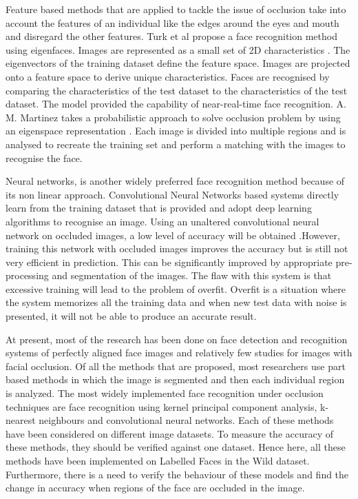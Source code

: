 \documentclass[conference]{IEEEtran}
\begin{document}
Feature based methods that are applied to tackle the issue of occlusion take into account the features of an individual like the edges around the eyes and mouth and disregard the other features. Turk et al propose a face recognition method using eigenfaces. Images are represented as a small set of 2D characteristics \cite{turk1991face}. The eigenvectors of the training dataset define the  feature space. Images are projected onto a feature space to derive unique characteristics. Faces are recognised by comparing the characteristics of the test dataset to the characteristics of the test dataset. The model provided the  capability of near-real-time face recognition. A. M. Martinez takes a probabilistic approach to solve occlusion problem by using an eigenspace representation \cite{martinez2000recognition}. Each image is divided into multiple regions and is analysed to recreate the training set and perform a matching with the images to recognise the face.

Neural networks, is another widely preferred face recognition method because of its non linear approach. Convolutional Neural Networks based systems directly learn from the training dataset that is provided and adopt deep learning algorithms to recognise an image. Using an unaltered convolutional neural network on occluded images, a low level of accuracy will be obtained \cite{chandler2016mitigation}.However, training this network with occluded images improves the accuracy but is still not very efficient in prediction. This can be significantly improved by appropriate pre-processing and segmentation of the images. The flaw with this system is that excessive training will lead to the problem of overfit. Overfit is a situation where the system memorizes all the training data and when new test data with noise is presented, it will not be able to produce an accurate result.

At present, most of the research has been done on face detection and recognition systems of perfectly aligned face images and relatively few studies for images with facial occlusion. Of all the methods that are proposed, most researchers use part based methods in which the image is segmented and then each individual region is analyzed. The most widely implemented face recognition under occlusion techniques are face recognition using kernel principal component analysis, k-nearest neighbours and convolutional neural networks. Each of these methods have been considered on different image datasets. To measure the accuracy of these methods, they should be verified against one dataset. Hence here, all these methods have been implemented on Labelled Faces in the Wild dataset. Furthermore, there is a need to verify the behaviour of these models and find the change in accuracy when regions of the face are occluded in the image.
\end{document}
